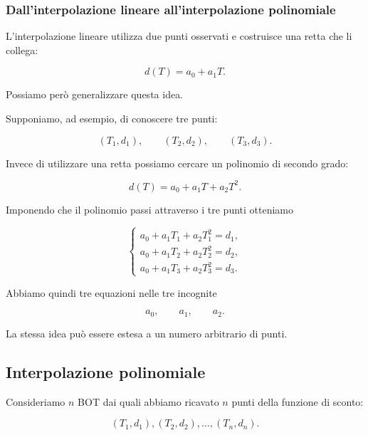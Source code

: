 \subsubsection{Dall'interpolazione lineare all'interpolazione polinomiale}

L'interpolazione lineare utilizza due punti osservati e costruisce una
retta che li collega:

\begin{equation*}
    d(T)=a_0+a_1T.
\end{equation*}

Possiamo però generalizzare questa idea.

Supponiamo, ad esempio, di conoscere tre punti:

\begin{equation*}
    (T_1,d_1),\qquad
    (T_2,d_2),\qquad
    (T_3,d_3).
\end{equation*}

Invece di utilizzare una retta possiamo cercare un polinomio di
secondo grado:

\begin{equation*}
    d(T)=a_0+a_1T+a_2T^2.
\end{equation*}

Imponendo che il polinomio passi attraverso i tre punti otteniamo

\begin{equation*}
\begin{cases}
a_0+a_1T_1+a_2T_1^2=d_1,\\
a_0+a_1T_2+a_2T_2^2=d_2,\\
a_0+a_1T_3+a_2T_3^2=d_3.
\end{cases}
\end{equation*}

Abbiamo quindi tre equazioni nelle tre incognite

\begin{equation*}
    a_0,\qquad a_1,\qquad a_2.
\end{equation*}

La stessa idea può essere estesa a un numero arbitrario di punti.


\subsection{Interpolazione polinomiale}

Consideriamo $n$ BOT dai quali abbiamo ricavato $n$ punti della
funzione di sconto:

\begin{equation*}
    (T_1,d_1),(T_2,d_2),\ldots,(T_n,d_n).
\end{equation*}

